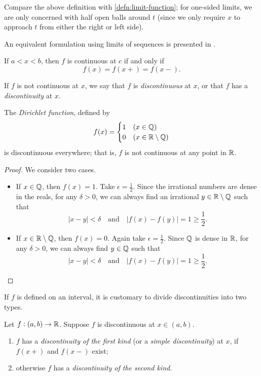 \begin{remark}
Compare the above definition with \cref{defn:limit-function}; for one-sided limits, we are only concerned with half open balls around $t$ (since we only require $x$ to approach $t$ from either the right or left side).
\end{remark}

\begin{remark}
An equivalent formulation using limits of sequences is presented in \cite{rudin}.
\end{remark}

\begin{lemma}
If $a<x<b$, then $f$ is continuous at $c$ if and only if
\[f(x)=f(x+)=f(x-).\]
\end{lemma}

If $f$ is not continuous at $x$, we say that $f$ is \emph{discontinuous} at $x$, or that $f$ has a \emph{discontinuity} at $x$.

\begin{example}
The \emph{Dirichlet function}, defined by
\[f(x)=\begin{cases}
1&(x\in\mathbb Q)\\
0&(x\in\mathbb R\setminus\mathbb Q)
\end{cases}\]
is discontinuous everywhere; that is, $f$ is not continuous at any point in $\mathbb R$.
\begin{proof}
We consider two cases.
\begin{itemize}
\item If $x\in\mathbb Q$, then $f(x)=1$. Take $\epsilon=\frac{1}{2}$. Since the irrational numbers are dense in the reals, for any $\delta>0$, we can always find an irrational $y\in\mathbb R\setminus\mathbb Q$ such that 
\[|x-y|<\delta\quad\text{and}\quad |f(x)-f(y)|=1\ge\frac{1}{2}.\]
\item If $x\in\mathbb R\setminus\mathbb Q$, then $f(x)=0$. Again take $\epsilon=\frac{1}{2}$. Since $\mathbb Q$ is dense in $\mathbb R$, for any $\delta>0$, we can always find $y\in\mathbb Q$ such that
\[|x-y|<\delta\quad\text{and}\quad |f(x)-f(y)|=1\ge\frac{1}{2}.\]
\end{itemize}
\end{proof}
\end{example}

If $f$ is defined on an interval, it is customary to divide discontinuities into two types.

\begin{definition}[Discontinuities]
Let $f:(a,b)\to\mathbb R$. Suppose $f$ is discontinuous at $x\in(a,b)$.
\begin{enumerate}[label=(\roman*)]
\item $f$ has a \emph{discontinuity of the first kind} (or a \emph{simple discontinuity}) at $x$, if $f(x+)$ and $f(x-)$ exist;
\item otherwise $f$ has a \emph{discontinuity of the second kind}.
\end{enumerate}
\end{definition}

